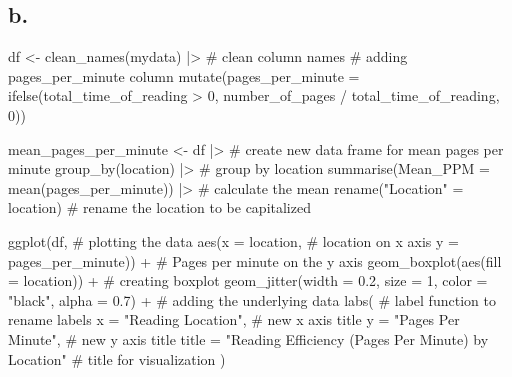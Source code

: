 \documentclass[
  letterpaper,
  DIV=11,
  numbers=noendperiod]{scrartcl}
\newenvironment{Shaded}{\begin{snugshade}}{\end{snugshade}}
\newcommand{\AttributeTok}[1]{\textcolor[rgb]{0.40,0.45,0.13}{#1}}
\newcommand{\CommentTok}[1]{\textcolor[rgb]{0.37,0.37,0.37}{#1}}
\newcommand{\DecValTok}[1]{\textcolor[rgb]{0.68,0.00,0.00}{#1}}
\newcommand{\FloatTok}[1]{\textcolor[rgb]{0.68,0.00,0.00}{#1}}
\newcommand{\FunctionTok}[1]{\textcolor[rgb]{0.28,0.35,0.67}{#1}}
\newcommand{\NormalTok}[1]{\textcolor[rgb]{0.00,0.23,0.31}{#1}}
\newcommand{\OtherTok}[1]{\textcolor[rgb]{0.00,0.23,0.31}{#1}}
\newcommand{\SpecialCharTok}[1]{\textcolor[rgb]{0.37,0.37,0.37}{#1}}
\newcommand{\StringTok}[1]{\textcolor[rgb]{0.13,0.47,0.30}{#1}}
\begin{document}
\subsection{b.}\label{b.}

\begin{Shaded}
\begin{Highlighting}[]
\NormalTok{df }\OtherTok{\textless{}{-}} \FunctionTok{clean\_names}\NormalTok{(mydata) }\SpecialCharTok{|\textgreater{}} \CommentTok{\# clean column names}
  \CommentTok{\# adding pages\_per\_minute column}
  \FunctionTok{mutate}\NormalTok{(}\AttributeTok{pages\_per\_minute =} \FunctionTok{ifelse}\NormalTok{(total\_time\_of\_reading }\SpecialCharTok{\textgreater{}} \DecValTok{0}\NormalTok{,  number\_of\_pages }\SpecialCharTok{/}\NormalTok{ total\_time\_of\_reading, }\DecValTok{0}\NormalTok{))}

\NormalTok{mean\_pages\_per\_minute }\OtherTok{\textless{}{-}}\NormalTok{ df }\SpecialCharTok{|\textgreater{}} \CommentTok{\# create new data frame for mean pages per minute}
  \FunctionTok{group\_by}\NormalTok{(location) }\SpecialCharTok{|\textgreater{}} \CommentTok{\# group by location}
  \FunctionTok{summarise}\NormalTok{(}\AttributeTok{Mean\_PPM =} \FunctionTok{mean}\NormalTok{(pages\_per\_minute)) }\SpecialCharTok{|\textgreater{}} \CommentTok{\# calculate the mean}
  \FunctionTok{rename}\NormalTok{(}\StringTok{"Location"} \OtherTok{=}\NormalTok{ location) }\CommentTok{\# rename the location to be capitalized}

\FunctionTok{ggplot}\NormalTok{(df, }\CommentTok{\# plotting the data}
       \FunctionTok{aes}\NormalTok{(}\AttributeTok{x =}\NormalTok{ location, }\CommentTok{\# location on x axis}
               \AttributeTok{y =}\NormalTok{ pages\_per\_minute)) }\SpecialCharTok{+} \CommentTok{\# Pages per minute on the y axis}
         \FunctionTok{geom\_boxplot}\NormalTok{(}\FunctionTok{aes}\NormalTok{(}\AttributeTok{fill =}\NormalTok{ location)) }\SpecialCharTok{+} \CommentTok{\# creating boxplot}
  \FunctionTok{geom\_jitter}\NormalTok{(}\AttributeTok{width =} \FloatTok{0.2}\NormalTok{, }\AttributeTok{size =} \DecValTok{1}\NormalTok{, }\AttributeTok{color =} \StringTok{"black"}\NormalTok{, }\AttributeTok{alpha =} \FloatTok{0.7}\NormalTok{) }\SpecialCharTok{+} \CommentTok{\# adding the underlying data}
  \FunctionTok{labs}\NormalTok{( }\CommentTok{\# label function to rename labels}
    \AttributeTok{x =} \StringTok{"Reading Location"}\NormalTok{, }\CommentTok{\# new x axis title}
    \AttributeTok{y =} \StringTok{"Pages Per Minute"}\NormalTok{, }\CommentTok{\# new y axis title}
    \AttributeTok{title =} \StringTok{"Reading Efficiency (Pages Per Minute) by Location"} \CommentTok{\# title for visualization}
\NormalTok{  )}
\end{Highlighting}
\end{Shaded}
\end{document}
